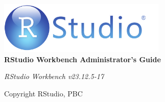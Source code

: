 

\begin{titlepage}
\begin{center}

\includegraphics[width=0.6\textwidth]{images/rstudio.pdf}~\\[3cm]

{ \fontsize{35}{35}\selectfont \bfseries{RStudio Workbench Administrator's Guide} \\[2cm] }

{ \large \emph{RStudio Workbench v23.12.5-17} \\[1.5cm] }

\vfill

{ \small Copyright \textcopyright {} RStudio, PBC }

\end{center}
\end{titlepage}
